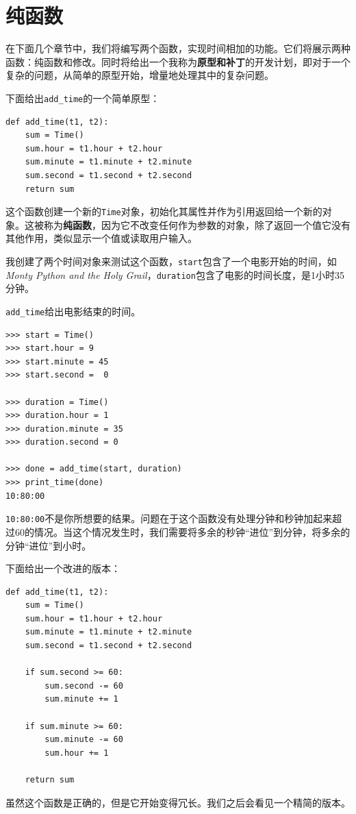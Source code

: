 \section{纯函数}

在下面几个章节中，我们将编写两个函数，实现时间相加的功能。它们将展示两种函数：纯函数和修改。同时将给出一个我称为{\bf 原型和补丁}的开发计划，即对于一个复杂的问题，从简单的原型开始，增量地处理其中的复杂问题。

下面给出\verb"add_time"的一个简单原型：

\beforeverb
\begin{verbatim}
def add_time(t1, t2):
    sum = Time()
    sum.hour = t1.hour + t2.hour
    sum.minute = t1.minute + t2.minute
    sum.second = t1.second + t2.second
    return sum
\end{verbatim}
\afterverb
%
这个函数创建一个新的{\tt Time}对象，初始化其属性并作为引用返回给一个新的对象。这被称为{\bf 纯函数}，因为它不改变任何作为参数的对象，除了返回一个值它没有其他作用，类似显示一个值或读取用户输入。


我创建了两个时间对象来测试这个函数，{\tt start}包含了一个电影开始的时间，如{\em Monty Python and the Holy Grail}，{\tt duration}包含了电影的时间长度，是1小时35分钟。


\verb"add_time"给出电影结束的时间。

\beforeverb
\begin{verbatim}
>>> start = Time()
>>> start.hour = 9
>>> start.minute = 45
>>> start.second =  0

>>> duration = Time()
>>> duration.hour = 1
>>> duration.minute = 35
>>> duration.second = 0

>>> done = add_time(start, duration)
>>> print_time(done)
10:80:00
\end{verbatim}
\afterverb
%
{\tt 10:80:00}不是你所想要的结果。问题在于这个函数没有处理分钟和秒钟加起来超过60的情况。当这个情况发生时，我们需要将多余的秒钟“进位”到分钟，将多余的分钟“进位”到小时。


下面给出一个改进的版本：

\beforeverb
\begin{verbatim}
def add_time(t1, t2):
    sum = Time()
    sum.hour = t1.hour + t2.hour
    sum.minute = t1.minute + t2.minute
    sum.second = t1.second + t2.second

    if sum.second >= 60:
        sum.second -= 60
        sum.minute += 1

    if sum.minute >= 60:
        sum.minute -= 60
        sum.hour += 1

    return sum
\end{verbatim}
\afterverb
%
虽然这个函数是正确的，但是它开始变得冗长。我们之后会看见一个精简的版本。


